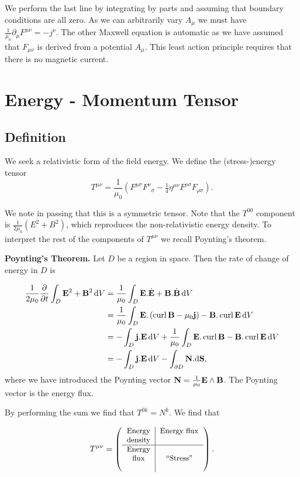 \documentclass{notes}
\newcommand{\B}{\vect{B}}
\newcommand{\E}{\vect{E}}
\newcommand{\jc}{\vect{j}}
\DeclareMathOperator{\curl}{curl}
\begin{document}
We perform the last line by integrating by parts and assuming that
boundary conditions are all zero.  As we can arbitrarily vary
$A_\mu$ we must have $\tfrac{1}{\mu_0} \partial_\mu F^{\mu \nu} = - j^\nu$.
The other Maxwell equation is automatic as we have assumed that
$F_{\mu \nu}$ is derived from a potential $A_\mu$. This least action
principle requires that there is no magnetic current.

\chapter{Energy - Momentum Tensor}

\section{Definition}

We seek a relativistic form of the field energy.  We define the
(stress-)energy tensor
\[
T^{\mu \nu} = \frac{1}{\mu_0} \left( F^{\mu \sigma} F^\nu{}_\sigma
- \tfrac{1}{4} \eta^{\mu \nu} F^{\rho \sigma} F_{\rho \sigma}
\right).
\]

We note in passing that this is a symmetric tensor. Note that the
$T^{0 0}$ component is $\frac{1}{2 \mu_0} \left( E^2 + B^2 \right)$,
which reproduces the non-relativistic energy density.  To interpret
the rest of the components of $T^{\mu \nu}$ we recall Poynting's
theorem.

\textbf{Poynting's Theorem.}   Let $D$ be a region in space.  Then the
rate of change of energy in $D$ is

\begin{align*}
\frac{1}{2 \mu_0} \pd{}{t} \int_D \E^2 + \B^2\, \ud V
&= \frac{1}{\mu_0} \int_D \E.\dot{\E} + \B.\dot{\B}\, \ud V \\
&= \frac{1}{\mu_0} \int_D \E.\left( \curl \B - \mu_0 \jc \right)
- \B.\curl \E\, \ud V \\
&= - \int_D \jc . \E\, \ud V
+ \frac{1}{\mu_0} \int_D \E.\curl \B  - \B.\curl \E\, \ud V \\
&= - \int_D \jc . \E\, \ud V - \int_{\partial D} \vect{N}.\ud \vect{S},
\end{align*}
where we have introduced the Poynting vector $\vect{N} = \frac{1}{\mu_0}
\E \wedge \B$.  The Poynting vector is the energy flux.

By performing the sum we find that $T^{0 k} = N^k$.  We find that

\[
T^{\mu \nu}
= \left( \text{\small\begin{tabular}{c | c}
  Energy & Energy flux \\
  density & \\ \hline
  Energy & \\
  flux   & ``Stress'' \\
         &
\end{tabular}}\right).
\]
\end{document}
